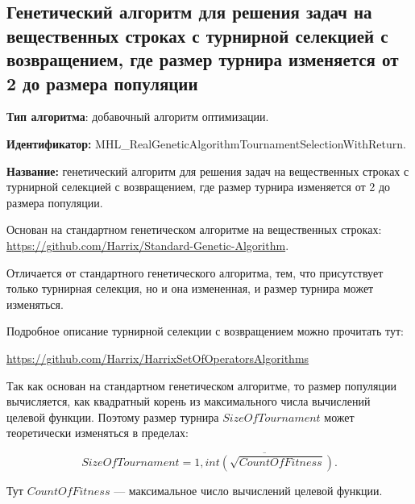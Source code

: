 \subsection{Генетический алгоритм для решения задач на вещественных строках с турнирной селекцией с возвращением, где размер турнира изменяется от 2 до размера популяции}\label{HarrixOptimizationAlgorithms:MHL_RealGeneticAlgorithmTournamentSelectionWithReturn}

\textbf{Тип алгоритма}: добавочный алгоритм оптимизации.

\textbf{Идентификатор:} MHL\_RealGeneticAlgorithmTournamentSelectionWithReturn.

\textbf{Название:} генетический алгоритм для решения задач на вещественных строках с турнирной селекцией с возвращением, где размер турнира изменяется от 2 до размера популяции.

Основан на стандартном генетическом алгоритме на вещественных строках:  \href{https://github.com/Harrix/Standard-Genetic-Algorithm}{https://github.com/Harrix/Standard-Genetic-Algorithm}. 

Отличается от стандартного генетического алгоритма, тем, что присутствует только турнирная селекция, но и она измененная, и размер турнира может изменяться.

Подробное описание турнирной селекции с возвращением можно прочитать тут:

\href{https://github.com/Harrix/HarrixSetOfOperatorsAlgorithms}{https://github.com/Harrix/HarrixSetOfOperatorsAlgorithms}


Так как основан на стандартном генетическом алгоритме, то размер популяции вычисляется, как квадратный корень из максимального числа вычислений целевой функции. Поэтому размер турнира $SizeOfTournament$ может теоретически  изменяться в пределах:

\begin{equation}
SizeOfTournament = \overline{1,int\left( \sqrt{CountOfFitness}\right) }.
\end{equation}

Тут $CountOfFitness$ --- максимальное число вычислений целевой функции.

